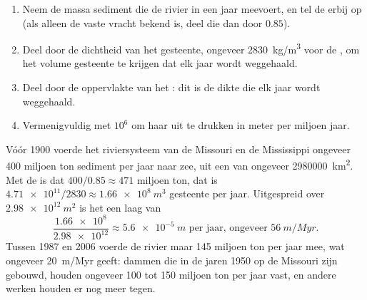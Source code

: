 \begin{method}\label{met:g12:destruction-of-mountains:budget}
\begin{enumerate}
  \item Neem de massa sediment die de rivier in een jaar meevoert, en tel de
         erbij op (als alleen de vaste vracht bekend is, deel die dan door
        $0.85$).
  \item Deel door de dichtheid van het gesteente, ongeveer \qty{2830}{kg/m^3} voor de
        , om het volume gesteente te krijgen dat elk jaar wordt weggehaald.
  \item Deel door de oppervlakte van het : dit is de dikte die
        elk jaar wordt weggehaald.
  \item Vermenigvuldig met $10^6$ om haar uit te drukken in meter per miljoen jaar.
\end{enumerate}
\end{method}

\begin{example}[De Mississippi]\label{ex:g12:destruction-of-mountains:mississippi}
Vóór 1900 voerde het riviersysteem van de Missouri en de Mississippi ongeveer 400
miljoen ton sediment per jaar naar zee, uit een  van ongeveer
\qty{2980000}{km^2}. Met de  is dat $400/0.85 \approx 471$ miljoen
ton, dat is $\num{4.71e11}/2830 \approx \qty{1.66e8}{m^3}$ gesteente per jaar.
Uitgespreid over $\qty{2.98e12}{m^2}$ is het een laag van
\[
  \frac{\num{1.66e8}}{\num{2.98e12}} \approx \qty{5.6e-5}{m}
  \text{ per jaar, ongeveer } \qty{56}{m/Myr}.
\]
Tussen 1987 en 2006 voerde de rivier maar 145 miljoen ton per jaar mee, wat
ongeveer \qty{20}{m/Myr} geeft: dammen die in de jaren 1950 op de Missouri zijn gebouwd, houden
ongeveer 100 tot 150 miljoen ton per jaar vast, en andere werken houden er nog meer tegen.
\end{example}

